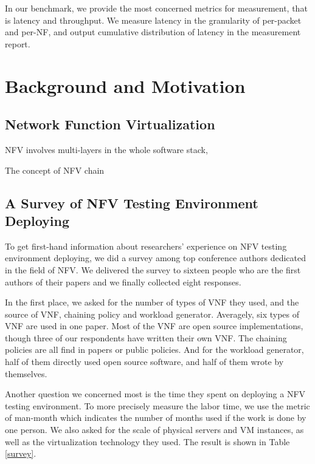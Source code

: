 \documentclass{sig-alternate-10pt}
\begin{document}
In our benchmark, we provide the most concerned metrics for measurement, 
that is latency and throughput. 
We measure latency in the granularity of per-packet and per-NF, 
and output cumulative distribution of latency in the measurement report. 


\section{Background and Motivation}


\subsection{Network Function Virtualization}
NFV involves multi-layers in the whole software stack, 

The concept of NFV chain

\subsection{A Survey of NFV Testing Environment \\Deploying}
To get first-hand information about researchers' experience on 
NFV testing environment deploying, 
we did a survey among top conference authors 
dedicated in the field of NFV. 
We delivered the survey to sixteen people 
who are the first authors of their papers %
and we finally collected eight responses. 

In the first place, we asked for the number of types of VNF they used, 
and the source of VNF, chaining policy and workload generator. 
Averagely, six types of VNF are used in one paper. 
Most of the VNF are open source implementations, 
though three of our respondents have written their own VNF. 
The chaining policies are all find in papers or public policies. 
And for the workload generator, 
half of them directly used open source software, 
and half of them wrote by themselves.

Another question we concerned most is 
the time they spent on deploying a NFV testing environment. 
To more precisely measure the labor time, 
we use the metric of man-month 
which indicates the number of months used 
if the work is done by one person. 
We also asked for the scale of physical servers and VM instances, 
as well as the virtualization technology they used. 
The result is shown in Table \ref{survey}.
\end{document}
